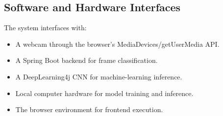 \documentclass{article}
\begin{document}
\subsection{Software and Hardware Interfaces}
The system interfaces with:
\begin{itemize}
    \item A webcam through the browser's MediaDevices/getUserMedia API.
    \item A Spring Boot backend for frame classification.
    \item A DeepLearning4j CNN for machine-learning inference.
    \item Local computer hardware for model training and inference.
    \item The browser environment for frontend execution.
\end{itemize}
\end{document}
